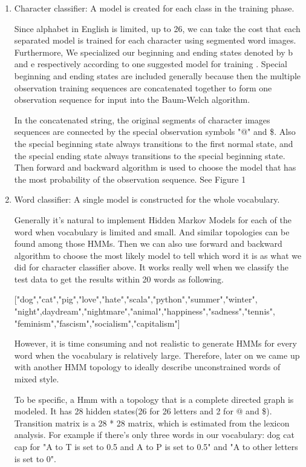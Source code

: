\begin{enumerate}
\item	Character classifier: A model is created for each class in the training phase.

Since alphabet in English is limited, up to 26, we can take the cost that each separated model is trained for each character using segmented word images.
Furthermore, We specialized our beginning and ending states denoted by b and e respectively according to one suggested model for training \cite{Laan}.
Special beginning and ending states are included generally because then the multiple observation training sequences are concatenated together to form one observation sequence for input into the Baum-Welch algorithm\cite{Laan}.

In the concatenated string, the original segments of character images sequences are connected by the special observation symbols "@" and \$.
 Also the special beginning state always transitions to the first normal state, and the special ending state always transitions to the special beginning state. Then forward and backward algorithm is used to choose the model that has the most probability of the observation sequence. See Figure 1



\item	Word classifier: A single model is constructed for the whole vocabulary. 

Generally it’s natural to implement Hidden Markov Models for each of the word when vocabulary is limited and small. And similar topologies can be found among those HMMs. Then we can also use forward and backward algorithm to choose the most likely model to tell which word it is as what we did for character classifier above. It works really well when we classify the test data to get the results within 20 words as following.

["dog","cat","pig","love","hate","scala","python","summer","winter",\\"night",daydream","nightmare","animal","happiness","sadness","tennis",\\"feminism","fascism","socialism","capitalism"]

However, it is time consuming and not realistic to generate HMMs for every word when the vocabulary is relatively large. Therefore, later on we came up with another HMM topology to ideally describe unconstrained words of mixed style.

To be specific, a Hmm  with a topology that is a complete directed graph is modeled. It has 28 hidden states(26 for 26 letters and 2 for @ and \$). 
Transition matrix is a 28 * 28 matrix, which is estimated from the lexicon analysis. For example if there's only three words in our vocabulary: dog cat cap for "A to T is set to 0.5 and A to P is set to 0.5" and "A to other letters is set to 0".


\end{enumerate}

